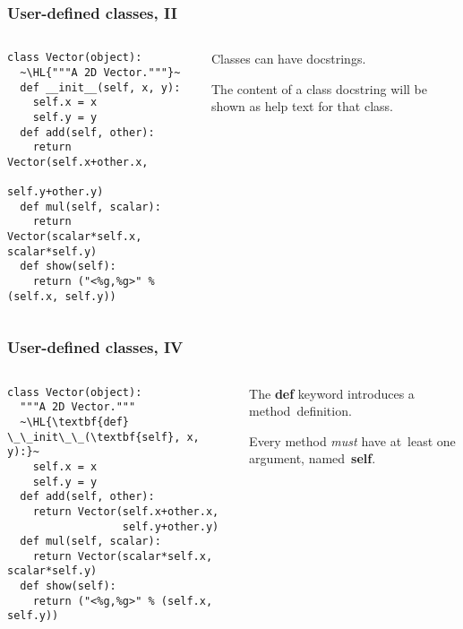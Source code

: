 \documentclass[english,serif,mathserif,xcolor=pdftex,dvipsnames,table]{beamer}
\begin{document}
\begin{frame}[fragile]
  \frametitle{User-defined classes, II}
  \begin{columns}[t]
    \begin{column}{0.5\textwidth}
\begin{lstlisting}
class Vector(object):
  ~\HL{"""A 2D Vector."""}~
  def __init__(self, x, y):
    self.x = x
    self.y = y
  def add(self, other):
    return Vector(self.x+other.x,
                  self.y+other.y)
  def mul(self, scalar):
    return Vector(scalar*self.x, scalar*self.y)
  def show(self):
    return ("<%g,%g>" % (self.x, self.y))
\end{lstlisting}
    \end{column}
    \begin{column}{0.5\textwidth}
      \raggedleft
      Classes can have docstrings.

      The content of a class docstring will be shown as help text for
      that class.
    \end{column}
  \end{columns}
\end{frame}


\begin{frame}[fragile]
  \frametitle{User-defined classes, IV}
  \begin{columns}[t]
    \begin{column}{0.5\textwidth}
\begin{lstlisting}
class Vector(object):
  """A 2D Vector."""
  ~\HL{\textbf{def} \_\_init\_\_(\textbf{self}, x, y):}~
    self.x = x
    self.y = y
  def add(self, other):
    return Vector(self.x+other.x,
                  self.y+other.y)
  def mul(self, scalar):
    return Vector(scalar*self.x, scalar*self.y)
  def show(self):
    return ("<%g,%g>" % (self.x, self.y))
\end{lstlisting}
    \end{column}
    \begin{column}{0.5\textwidth}
      \raggedleft
      The {\bf def} keyword introduces a method~definition.

      \+
      Every method \emph{must} have at~least one argument,
      named~{\bf self}.
    \end{column}
  \end{columns}
\end{frame}
\end{document}
